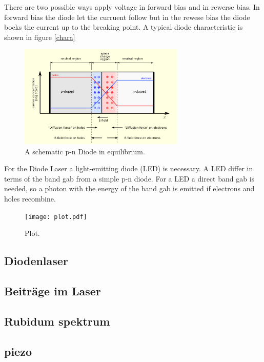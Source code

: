 There are two possible ways apply voltage
in forward bias and
in rewerse bias.
In forward bias the diode let the curruent follow
but in the rewese bias the diode bocks the current up to the breaking point.
A typical diode characteristic is shown in figure \ref{chara}
\begin{figure}
\centering
\includegraphics[width=0.7\textwidth]{equilibrium.png}
\caption{A schematic p-n Diode in equilibrium.
\cite{sparkfun}} %
\label{fig:chara}
\end{figure}
For the Diode Laser a light-emitting diode (LED)
is necessary. A LED differ in terms of
the band gab
from a simple p-n diode.
For a LED a direct band gab is needed, so a photon
with the energy of the band gab is
emitted if electrons and holes recombine.


\begin{figure}
  \centering
  \texttt{[image: plot.pdf]}
  \caption{Plot.}
  \label{fig:plot}
\end{figure}



\subsection{Diodenlaser}
\label{subsec:diodenlaser}


\subsection{Beiträge im Laser}
\label{subsec:}



\subsection{Rubidum spektrum}
\label{subsec:}


\subsection{piezo}
\label{subsec:}
